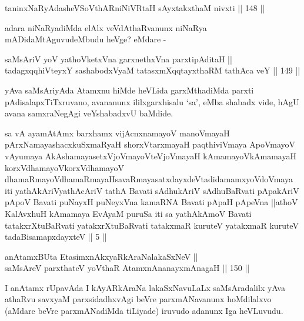\begin{shl}
taninxNaRyAdasheVSoV\s thAR\s niNiVRtaH sAyxtakxthaM nivxti \hfill || 148 ||  
\end{shl}

\begin{artha}
adara niNaRyadiMda elAlx veVdAthaRvanunx niNaRya mADidaMtAguvudeMbudu
heVge? eMdare -
\end{artha}

\begin{shl}
saMsAriV yoV yathoVketxVna garxnethxVna parxtipAditaH || \\
tadagxqqhiVteyxY sashabodxV\s yaM tatasxmXqqtayxthaRM tathAca veY \hfill || 149 ||  
\end{shl}

\begin{artha}
yAva saMsAriyAda Atamxnu hiMde heVLida garxMthadiMda parxti
pAdisalapxTiTxruvano, avananunx ililxgarxhisalu `sa', eMba shabadx
vide, hAgU avana samxraNegAgi veYshabadxvU baMdide.
\end{artha}

\begin{kandikeshl}
sa vA ayamAtAmx barxhamx vijAcnxnamayoV manoVmayaH pArxNamayashacxkuSxmaRyaH shorxVtarxmayaH paqthiviVmaya ApoVmayoV vAyumaya AkAshamayasetxVjoVmayoV\s teVjoVmayaH kAmamayoV\s kAmamayaH korxVdhamayoV\s korxVdhamayoV dhamaRmayoV\s dhamaRmayaH\break savaRmayasatxdayxdeVtadidamamxyoV\s doVmaya iti yathAkAriV\break yathAcAriV tathA Bavati sAdhukAriV sAdhuBaRvati pApakAriV pApoV Bavati puNayxH puNeyxVna kamaRNA Bavati pApaH pApeVna ||athoV KalAvxhuH kAmamaya EvAyaM puruSa iti sa yathAkAmoV Bavati tatakxrXtuBaRvati yatakxrXtuBaRvati tatakxmaR kuruteV yatakxmaR kuruteV tadaBisamapxdayxteV || 5 ||
\end{kandikeshl}

\begin{shl}
anAtamxBUta EtasimxnAkxyaRkAraNalakaSxNeV || \\
saMsAreV parxthateV yoV\s thaR AtamxnA\s nanayxmAnagaH \hfill || 150 ||  
\end{shl}

\begin{artha}
I anAtamx rUpavAda I kAyARkAraNa lakaSxNavuLaLx saMsAradalilx yAva
athaRvu savxyaM parxsidadhxvAgi beVre parxmANavanunx hoMdilalxvo
(aMdare beVre parxmANadiMda tiLiyade) iruvudo adanunx Iga heVLuvudu.
\end{artha}

